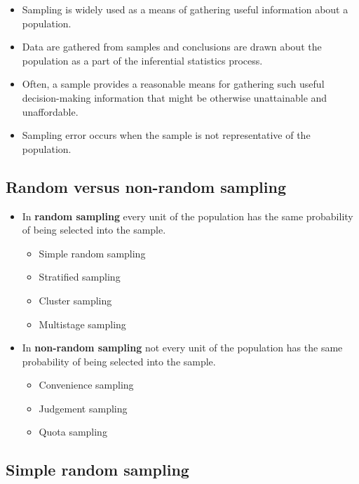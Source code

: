 \documentclass[
]{article}
\providecommand{\tightlist}{%
  \setlength{\itemsep}{0pt}\setlength{\parskip}{0pt}}
\begin{document}
\begin{itemize}
\tightlist
\item
  Sampling is widely used as a means of gathering useful information
  about a population.
\item
  Data are gathered from samples and conclusions are drawn about the
  population as a part of the inferential statistics process.
\item
  Often, a sample provides a reasonable means for gathering such useful
  decision-making information that might be otherwise unattainable and
  unaffordable.
\item
  Sampling error occurs when the sample is not representative of the
  population.
\end{itemize}

\hypertarget{random-versus-non-random-sampling}{%
\subsection{Random versus non-random
sampling}\label{random-versus-non-random-sampling}}

\begin{itemize}
\item
  In \textbf{random sampling} every unit of the population has the same
  probability of being selected into the sample.

  \begin{itemize}
  \tightlist
  \item
    Simple random sampling
  \item
    Stratified sampling
  \item
    Cluster sampling
  \item
    Multistage sampling
  \end{itemize}
\item
  In \textbf{non-random sampling} not every unit of the population has
  the same probability of being selected into the sample.

  \begin{itemize}
  \tightlist
  \item
    Convenience sampling
  \item
    Judgement sampling
  \item
    Quota sampling
  \end{itemize}
\end{itemize}

\hypertarget{simple-random-sampling}{%
\subsection{Simple random sampling}\label{simple-random-sampling}}
\end{document}
